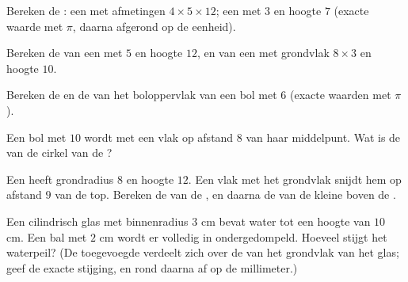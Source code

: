 \begin{exercise}[$\star$]\label{exo:g9:solids:1}
Bereken de : een  met afmetingen $4 \times 5 \times 12$; een 
met  $3$ en hoogte $7$ (exacte waarde met $\pi$, daarna afgerond op de
eenheid).
\end{exercise}

\begin{exercise}[$\star$]\label{exo:g9:solids:2}
Bereken de  van een  met  $5$ en hoogte $12$, en van een 
met  grondvlak $8 \times 3$ en hoogte $10$.
\end{exercise}

\begin{exercise}[$\star$]\label{exo:g9:solids:3}
Bereken de  en de  van het boloppervlak van een bol met  $6$
(exacte waarden met $\pi$).
\end{exercise}

\begin{exercise}[$\star$]\label{exo:g9:solids:4}
Een bol met  $10$ wordt  met een vlak op afstand $8$ van haar
middelpunt. Wat is de  van de cirkel van de ?
\end{exercise}

\begin{exercise}[$\star\star$]\label{exo:g9:solids:5}
Een  heeft grondradius $8$ en hoogte $12$. Een vlak  met het grondvlak
snijdt hem op afstand $9$ van de top. Bereken de  van de , en daarna
de  van de kleine  boven de .
\end{exercise}

\begin{exercise}[$\star\star$]\label{exo:g9:solids:6}
Een cilindrisch glas met binnenradius $3$ cm bevat water tot een hoogte van $10$
cm. Een bal met  $2$ cm wordt er volledig in ondergedompeld. Hoeveel stijgt
het waterpeil? (De toegevoegde  verdeelt zich over de  van het
grondvlak van het glas; geef de exacte stijging, en rond daarna af op de
millimeter.)
\end{exercise}

